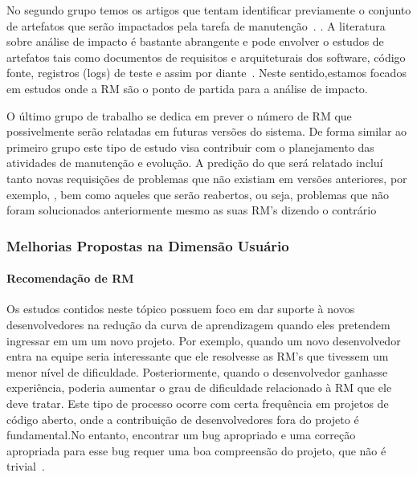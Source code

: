 No segundo grupo temos os artigos que tentam identificar previamente o conjunto
de artefatos que serão impactados pela tarefa de manutenção~\cite{Nagwani2010}.
. A literatura sobre análise de
impacto é bastante abrangente e pode envolver o estudos de artefatos tais como
documentos de requisitos e arquiteturais dos software, código fonte, registros
(logs) de teste e assim por diante~\cite{cavalcanti2014challenges}. Neste
sentido,estamos focados em estudos onde a RM são o ponto de partida para a
análise de impacto.

O último grupo de trabalho se dedica em prever o número de RM que possivelmente
serão relatadas em futuras versões do sistema. De forma similar ao primeiro
grupo este tipo de estudo visa contribuir com o planejamento das atividades de
manutenção e evolução. A predição do que será relatado incluí tanto novas
requisições de problemas que não existiam em versões anteriores, por exemplo,
, bem
como aqueles que serão reabertos, ou seja, problemas que não foram solucionados
anteriormente mesmo as suas RM's dizendo o contrário~\cite{xia2015automatic}

\subsubsection{Melhorias Propostas na Dimensão Usuário}
\label{ssub:melhorias_dim_usuario}

\paragraph{Recomendação de RM}
Os estudos contidos neste tópico possuem foco em dar suporte à novos
desenvolvedores na redução da curva de aprendizagem quando eles pretendem
ingressar em um um novo projeto. Por exemplo, quando um novo desenvolvedor entra
na equipe seria interessante que ele resolvesse as RM's que tivessem um menor
nível de dificuldade. Posteriormente, quando o desenvolvedor ganhasse
experiência, poderia aumentar o grau de dificuldade relacionado à RM que ele
deve tratar. Este tipo de processo ocorre com certa frequência em projetos de
código aberto, onde a contribuição de desenvolvedores fora do projeto é
fundamental.No entanto, encontrar um bug apropriado e uma correção apropriada
para esse bug requer uma boa compreensão do projeto, que não é
trivial~\cite{Wang2011bug}.

